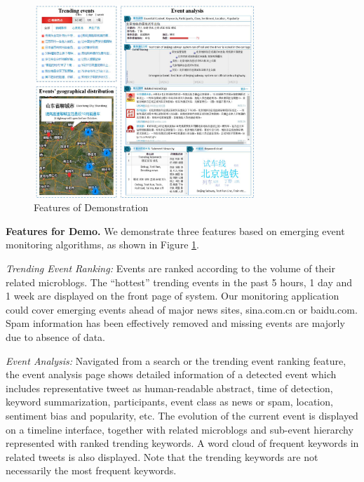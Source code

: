 \makeatletter
\setlength{\@fptop}{0pt}
\makeatother

\begin{figure}[!t]
\centering
\includegraphics[width=3.3in, height=2.85in]{UI}
\caption{Features of Demonstration}
\label{fig:UI}
\end{figure}


\noindent\textbf{Features for Demo.}
We demonstrate three features based on emerging event monitoring algorithms, as shown in Figure \ref{fig:UI}.

\emph{Trending Event Ranking:}
Events are ranked according to the volume of their related microblogs.
The ``hottest'' trending events in the past 5 hours, 1 day and 1 week are displayed on the front page of \ring system.
Our monitoring application could cover emerging events ahead of major news sites, \eg sina.com.cn or baidu.com.
Spam information has been effectively removed and missing events are majorly due to absence of data.

\emph{Event Analysis:}
Navigated from a search or the trending event ranking feature, the event analysis page shows detailed information of a detected event which includes representative tweet as human-readable abstract, time of detection, keyword summarization, participants, event class as news or spam, location, sentiment bias and popularity, etc.
The evolution of the current event is displayed on a timeline interface, together with related microblogs and sub-event hierarchy represented with ranked trending keywords.
A word cloud of frequent keywords in related tweets is also displayed.
Note that the trending keywords are not necessarily the most frequent keywords.

